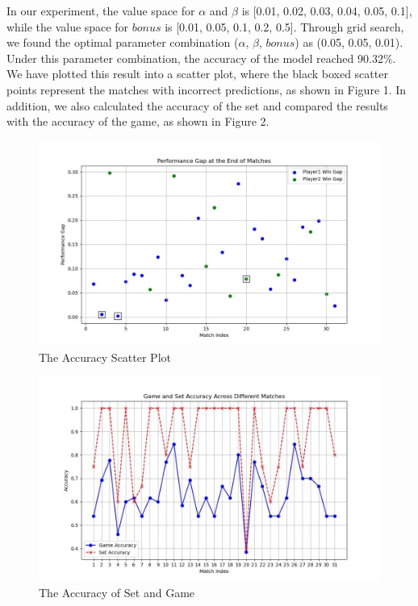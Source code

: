 \documentclass{mcmthesis}
\begin{document}
In our experiment, the value space for $\alpha$ and $\beta$ is [0.01, 0.02, 0.03, 0.04, 0.05, 0.1], while the value space for $bonus$ is [0.01, 0.05, 0.1, 0.2, 0.5]. Through grid search, we found the optimal parameter combination ($\alpha$, $\beta$, $bonus$) as (0.05, 0.05, 0.01). Under this parameter combination, the accuracy of the model reached 90.32\%. We have plotted this result into a scatter plot, where the black boxed scatter points represent the matches with incorrect predictions, as shown in Figure 1. In addition, we also calculated the accuracy of the set and compared the results with the accuracy of the game, as shown in Figure 2.

\begin{figure}[h]
\centering
\includegraphics[width=12cm]{figures/Accuracy scatter plot.jpg}
\caption{The Accuracy Scatter Plot} \label{fig:aa}
\end{figure}

\begin{figure}[h]
\centering
\includegraphics[width=12cm]{figures/set and game acc.jpg}
\caption{The Accuracy of Set and Game} \label{fig:aa}
\end{figure}
\end{document}
